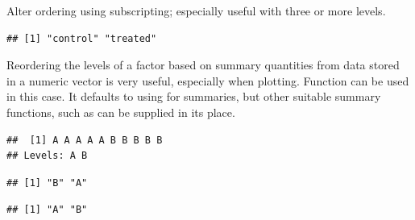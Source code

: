 \documentclass[krantz2]{krantz}\usepackage{knitr}
\begin{document}
\begin{explainbox}
Alter ordering using subscripting; especially useful with three or more levels.

\begin{knitrout}\footnotesize
{}\color{fgcolor}\begin{kframe}
\begin{alltt}
 \hlkwb{<-}   \hlstd{=} \hlstd{(my.factor2)[}\hlstd{(}\hlstd{,} \hlstd{)])}
\end{alltt}
\begin{verbatim}
## [1] "control" "treated"
\end{verbatim}
\end{kframe}
\end{knitrout}

Reordering the levels of a factor based on summary quantities from data stored in a numeric vector is very useful, especially when plotting. Function  can be used in this case. It defaults to using  for summaries, but other suitable summary functions, such as  can be supplied in its place.

\begin{knitrout}\footnotesize
{}\color{fgcolor}\begin{kframe}
\begin{alltt}
 \hlkwb{<-} \hlstd{(}\hlstd{,} \hlstd{,}  \hlstd{=} \hlstd{(}\hlstd{,} \hlstd{))}
 \hlkwb{<-} \hlstd{(}\hlstd{,} \hlstd{,} \hlstd{,} \hlstd{,} \hlstd{,} \hlstd{,} \hlstd{,} \hlstd{,} \hlstd{,} \hlstd{)}
\end{alltt}
\begin{verbatim}
##  [1] A A A A A B B B B B
## Levels: A B
\end{verbatim}
\begin{alltt}
 \hlkwb{<-} 
\end{alltt}
\begin{verbatim}
## [1] "B" "A"
\end{verbatim}
\begin{alltt}
 \hlkwb{<-}  \hlopt{-} 
\end{alltt}
\begin{verbatim}
## [1] "A" "B"
\end{verbatim}
\end{kframe}
\end{knitrout}


\end{explainbox}
\end{document}
